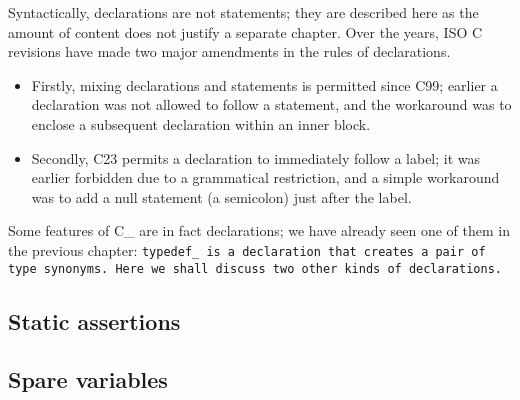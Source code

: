\def\Subsection#1{\subsection{#1}}

Syntactically, declarations are not statements; they are described
here as the amount of content does not justify a separate chapter.
Over the years, ISO C revisions have made two
major amendments in the rules of declarations.

\begin{itemize}

\item Firstly, mixing declarations and statements is permitted since C99;
earlier a declaration was not allowed to follow a statement,
and the workaround was to enclose a subsequent declaration within an inner block.

\item Secondly, C23 permits a declaration to immediately follow a label;
it was earlier forbidden due to a grammatical restriction, and a simple
workaround was to add a null statement (a semicolon) just after the label.

\end{itemize}

Some features of C\_ are in fact declarations;
we have already seen one of them in the previous chapter:
\tt{typedef_} is a declaration that creates a pair of type synonyms.
Here we shall discuss two other kinds of declarations.

\Subsection{Static assertions}

\Subsection{Spare variables}
